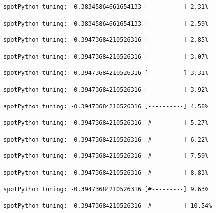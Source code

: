 \documentclass[
  letterpaper,
  DIV=11,
  numbers=noendperiod]{scrreprt}
\begin{document}
\begin{verbatim}
spotPython tuning: -0.38345864661654133 [----------] 2.31% 
\end{verbatim}

\begin{verbatim}
spotPython tuning: -0.38345864661654133 [----------] 2.59% 
\end{verbatim}

\begin{verbatim}
spotPython tuning: -0.39473684210526316 [----------] 2.85% 
\end{verbatim}

\begin{verbatim}
spotPython tuning: -0.39473684210526316 [----------] 3.07% 
\end{verbatim}

\begin{verbatim}
spotPython tuning: -0.39473684210526316 [----------] 3.31% 
\end{verbatim}

\begin{verbatim}
spotPython tuning: -0.39473684210526316 [----------] 3.92% 
\end{verbatim}

\begin{verbatim}
spotPython tuning: -0.39473684210526316 [----------] 4.58% 
\end{verbatim}

\begin{verbatim}
spotPython tuning: -0.39473684210526316 [#---------] 5.27% 
\end{verbatim}

\begin{verbatim}
spotPython tuning: -0.39473684210526316 [#---------] 6.22% 
\end{verbatim}

\begin{verbatim}
spotPython tuning: -0.39473684210526316 [#---------] 7.59% 
\end{verbatim}

\begin{verbatim}
spotPython tuning: -0.39473684210526316 [#---------] 8.83% 
\end{verbatim}

\begin{verbatim}
spotPython tuning: -0.39473684210526316 [#---------] 9.63% 
\end{verbatim}

\begin{verbatim}
spotPython tuning: -0.39473684210526316 [#---------] 10.54% 
\end{verbatim}
\end{document}
